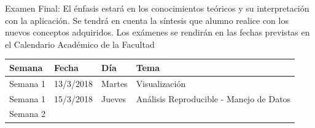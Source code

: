 \documentclass[]{book}
\theoremstyle{definition}
\theoremstyle{definition}
\theoremstyle{definition}
\theoremstyle{remark}
\begin{document}
Examen Final: El énfasis estará en los conocimientos teóricos y su
interpretación con la aplicación. Se tendrá en cuenta la síntesis que
alumno realice con los nuevos conceptos adquiridos. Los exámenes se
rendirán en las fechas previstas en el Calendario Académico de la
Facultad

\begin{longtable}[]{@{}llll@{}}
\toprule
\begin{minipage}[b]{0.07\columnwidth}\raggedright
Semana\strut
\end{minipage} & \begin{minipage}[b]{0.07\columnwidth}\raggedright
Fecha\strut
\end{minipage} & \begin{minipage}[b]{0.05\columnwidth}\raggedright
Día\strut
\end{minipage} & \begin{minipage}[b]{0.69\columnwidth}\raggedright
Tema\strut
\end{minipage}\tabularnewline
\midrule
\endhead
\begin{minipage}[t]{0.07\columnwidth}\raggedright
Semana 1\strut
\end{minipage} & \begin{minipage}[t]{0.07\columnwidth}\raggedright
13/3/2018\strut
\end{minipage} & \begin{minipage}[t]{0.05\columnwidth}\raggedright
Martes\strut
\end{minipage} & \begin{minipage}[t]{0.69\columnwidth}\raggedright
Visualización\strut
\end{minipage}\tabularnewline
\begin{minipage}[t]{0.07\columnwidth}\raggedright
Semana 1\strut
\end{minipage} & \begin{minipage}[t]{0.07\columnwidth}\raggedright
15/3/2018\strut
\end{minipage} & \begin{minipage}[t]{0.05\columnwidth}\raggedright
Jueves\strut
\end{minipage} & \begin{minipage}[t]{0.69\columnwidth}\raggedright
Análisis Reproducible - Manejo de Datos\strut
\end{minipage}\tabularnewline
\begin{minipage}[t]{0.07\columnwidth}\raggedright
Semana 2\strut
\end{minipage} & \begin{minipage}[t]{0.07\columnwidth}\raggedright

\end{minipage}
\end{longtable}
\end{document}
